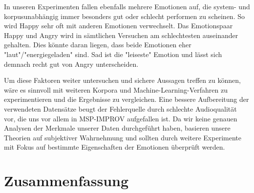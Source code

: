 \documentclass{article} %
\begin{document}
In unseren Experimenten fallen ebenfalls mehrere Emotionen auf, die system- und korpusunabhängig immer besonders gut oder schlecht performen zu scheinen. So wird Happy sehr oft mit anderen Emotionen verwechselt. Das Emotionspaar Happy und Angry wird in sämtlichen Versuchen am schlechtesten auseinander gehalten. Dies könnte daran liegen, dass beide Emotionen eher "laut"/"energiegeladen" sind. Sad ist die "leiseste" Emotion und lässt sich demnach recht gut von Angry unterscheiden. 

Um diese Faktoren weiter untersuchen und sichere Aussagen treffen zu können, wäre es sinnvoll mit weiteren Korpora und Machine-Learning-Verfahren zu experimentieren und die Ergebnisse zu vergleichen. Eine bessere Aufbereitung der verwendeten Datensätze beugt der Fehlerquelle durch schlechte Audioqualität vor, die uns vor allem in MSP-IMPROV aufgefallen ist. Da wir keine genauen Analysen der Merkmale unserer Daten durchgeführt haben, basieren unsere Theorien auf subjektiver Wahrnehmung und sollten durch weitere Experimente mit Fokus auf bestimmte Eigenschaften der Emotionen überprüft werden.
\section{Zusammenfassung}


\pagebreak
\tableofcontents
\pagebreak


\end{document}
